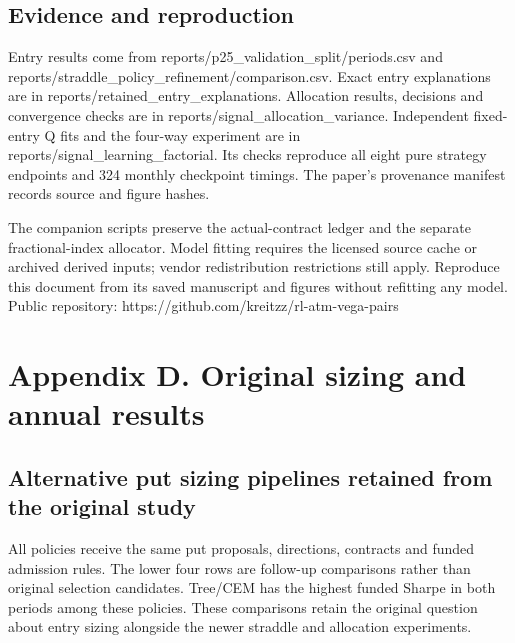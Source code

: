 \documentclass[11pt,letterpaper]{article}
\begin{document}
\subsection*{Evidence and reproduction}
Entry results come from reports/p25\_validation\_split/periods.csv and reports/straddle\_policy\_refinement/comparison.csv. Exact entry explanations are in reports/retained\_entry\_explanations. Allocation results, decisions and convergence checks are in reports/signal\_allocation\_variance. Independent fixed-entry Q fits and the four-way experiment are in reports/signal\_learning\_factorial. Its checks reproduce all eight pure strategy endpoints and 324 monthly checkpoint timings. The paper's provenance manifest records source and figure hashes.

The companion scripts preserve the actual-contract ledger and the separate fractional-index allocator. Model fitting requires the licensed source cache or archived derived inputs; vendor redistribution restrictions still apply. Reproduce this document from its saved manuscript and figures without refitting any model. Public repository: https://github.com/kreitzz/rl-atm-vega-pairs

\clearpage
\section*{Appendix D. Original sizing and annual results}
\subsection*{Alternative put sizing pipelines retained from the original study}
\begin{center}\small{}\end{center}
All policies receive the same put proposals, directions, contracts and funded admission rules. The lower four rows are follow-up comparisons rather than original selection candidates. Tree/CEM has the highest funded Sharpe in both periods among these policies. These comparisons retain the original question about entry sizing alongside the newer straddle and allocation experiments.
\end{document}
